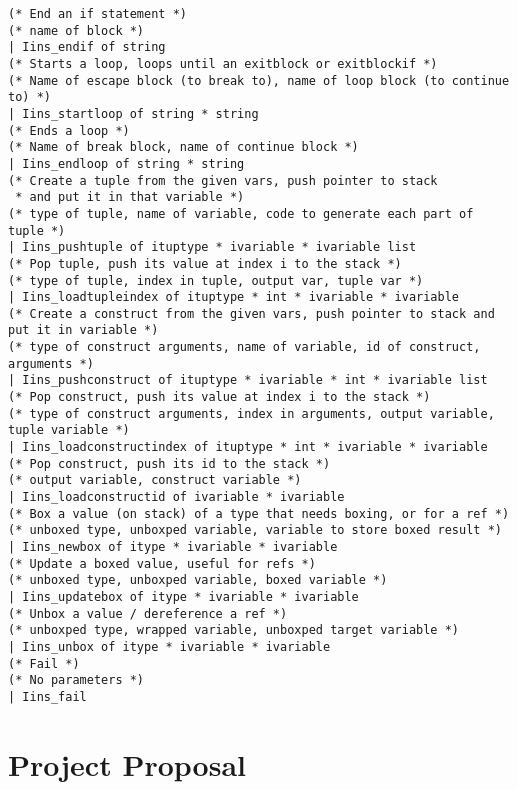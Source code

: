 \documentclass[12pt,twoside,notitlepage]{report}
\begin{document}
\begin{verbatim}
(* End an if statement *)
(* name of block *)
| Iins_endif of string
(* Starts a loop, loops until an exitblock or exitblockif *)
(* Name of escape block (to break to), name of loop block (to continue to) *)
| Iins_startloop of string * string
(* Ends a loop *)
(* Name of break block, name of continue block *)
| Iins_endloop of string * string
(* Create a tuple from the given vars, push pointer to stack
 * and put it in that variable *)
(* type of tuple, name of variable, code to generate each part of tuple *)
| Iins_pushtuple of ituptype * ivariable * ivariable list
(* Pop tuple, push its value at index i to the stack *)
(* type of tuple, index in tuple, output var, tuple var *)
| Iins_loadtupleindex of ituptype * int * ivariable * ivariable
(* Create a construct from the given vars, push pointer to stack and put it in variable *)
(* type of construct arguments, name of variable, id of construct, arguments *)
| Iins_pushconstruct of ituptype * ivariable * int * ivariable list
(* Pop construct, push its value at index i to the stack *)
(* type of construct arguments, index in arguments, output variable, tuple variable *)
| Iins_loadconstructindex of ituptype * int * ivariable * ivariable
(* Pop construct, push its id to the stack *)
(* output variable, construct variable *)
| Iins_loadconstructid of ivariable * ivariable
(* Box a value (on stack) of a type that needs boxing, or for a ref *)
(* unboxed type, unboxped variable, variable to store boxed result *)
| Iins_newbox of itype * ivariable * ivariable
(* Update a boxed value, useful for refs *)
(* unboxed type, unboxped variable, boxed variable *)
| Iins_updatebox of itype * ivariable * ivariable
(* Unbox a value / dereference a ref *)
(* unboxped type, wrapped variable, unboxped target variable *)
| Iins_unbox of itype * ivariable * ivariable
(* Fail *)
(* No parameters *)
| Iins_fail
\end{verbatim}


\clearpage

\chapter{Project Proposal}
\clearpage


\end{document}

